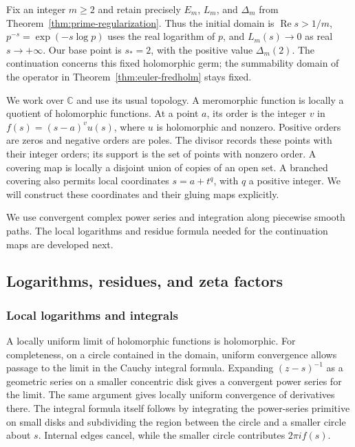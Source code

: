 Fix an integer \(m\geq2\) and retain precisely \(E_m\), \(L_m\), and
\(\Delta_m\) from Theorem~\ref{thm:prime-regularization}.
Thus the initial domain is \(\operatorname{Re}s>1/m\),
\(p^{-s}=\exp(-s\log p)\) uses the real logarithm of \(p\), and
\(L_m(s)\to0\) as real \(s\to+\infty\).
Our base point is \(s_*=2\), with the positive value \(\Delta_m(2)\).
The continuation concerns this fixed holomorphic germ; the summability
domain of the operator in Theorem~\ref{thm:euler-fredholm} stays fixed.

We work over \(\mathbb C\) and use its usual topology.  A meromorphic
function is locally a quotient of holomorphic functions.  At a point \(a\),
its order is the integer \(v\) in \(f(s)=(s-a)^v u(s)\), where \(u\)
is holomorphic and nonzero.  Positive orders are zeros and negative
orders are poles.  The divisor records these points with their integer
orders; its support is the set of points with nonzero order.
A covering map is locally a disjoint union of copies
of an open set.  A branched covering also permits local coordinates
\(s=a+t^q\), with \(q\) a positive integer.  We will construct these
coordinates and their gluing maps explicitly.

We use convergent complex power series and integration along piecewise
smooth paths.  The local logarithms and residue formula needed for the
continuation maps are developed next.

\subsection{Logarithms, residues, and zeta factors}

\subsubsection{Local logarithms and integrals}

A locally uniform limit of holomorphic functions is holomorphic.
For completeness, on a circle contained in the domain, uniform convergence
allows passage to the limit in the Cauchy integral formula.
Expanding \((z-s)^{-1}\) as a geometric series on a smaller concentric
disk gives a convergent power series for the limit.
The same argument gives locally uniform convergence of derivatives there.
The integral formula itself follows by integrating the power-series
primitive on small disks and subdividing the region between the circle
and a smaller circle about \(s\).  Internal edges cancel, while the
smaller circle contributes \(2\pi i f(s)\).

